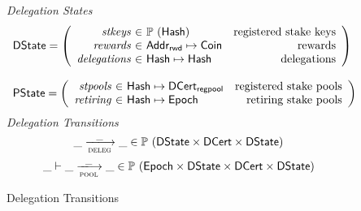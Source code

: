 \begin{figure}
  \emph{Delegation States}
  \begin{equation*}
    \begin{array}{l}
    \DState =
    \left(\begin{array}{r@{~\in~}lr}
      \var{stkeys} & \powerset (\Hash) & \text{registered stake keys}\\
      \var{rewards} & \AddrRWD \mapsto \Coin & \text{rewards}\\
      \var{delegations} & \Hash \mapsto \Hash & \text{delegations}\\
    \end{array}\right)
    \\
    \\
    \PState =
    \left(\begin{array}{r@{~\in~}lr}
      \var{stpools} & \Hash \mapsto \DCertRegPool & \text{registered stake pools}\\
      \var{retiring} & \Hash \mapsto \Epoch & \text{retiring stake pools}\\
    \end{array}\right)
    \end{array}
  \end{equation*}
  \emph{Delegation Transitions}
  \begin{equation*}
    \_ \trans{deleg}{\_} \_ \in
      \powerset (\DState \times \DCert \times \DState)
  \end{equation*}
  \begin{equation*}
    \_ \vdash \_ \trans{pool}{\_} \_ \in
      \powerset (\Epoch \times \DState \times \DCert \times \DState)
  \end{equation*}
  \caption{Delegation Transitions}
  \label{fig:delegation-transitions}
\end{figure}

